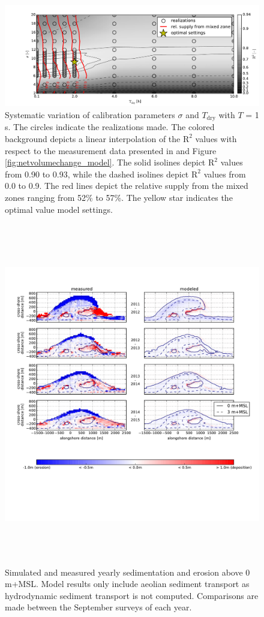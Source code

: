 \documentclass[preprint,12pt,authoryear]{elsarticle}
\begin{document}
\begin{figure}
  \centering
  \includegraphics[width=\columnwidth]{calibration}
  \caption{Systematic variation of calibration parameters $\sigma$ and
    $T_{\mathrm{dry}}$ with $T$ = 1 s. The circles indicate the
    realizations made. The colored background depicts a linear
    interpolation of the $\mathrm{R^2}$ values with respect to the
    measurement data presented in \citet{Hoonhout2017a} and Figure
    \ref{fig:netvolumechange_model}. The solid isolines depict
    $\mathrm{R}^2$ values from 0.90 to 0.93, while the dashed isolines
    depict $\mathrm{R}^2$ values from 0.0 to 0.9. The red lines depict
    the relative supply from the mixed zones ranging from 52\% to
    57\%. The yellow star indicates the optimal value model settings.}
  \label{fig:calibration}
\end{figure}

\begin{figure}
  \centering
  \includegraphics[height=15cm, angle=90]{model_sedero}
  \caption{Simulated and measured yearly sedimentation and erosion
    above 0 m+MSL. Model results only include aeolian sediment
    transport as hydrodynamic sediment transport is not
    computed. Comparisons are made between the September surveys of
    each year.}
  \label{fig:sedero_model}
\end{figure}
\end{document}

